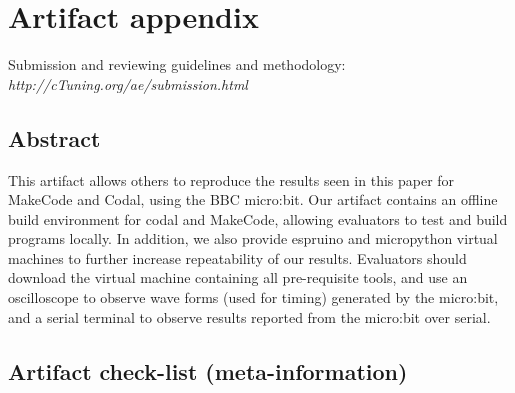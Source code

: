 \pagebreak
\appendix
\section{Artifact appendix}

Submission and reviewing guidelines and methodology: \\
{\em http://cTuning.org/ae/submission.html}

\subsection{Abstract}

This artifact allows others to reproduce the results seen in this paper for MakeCode and Codal, using the BBC micro:bit. Our artifact contains an offline build environment for codal and MakeCode, allowing evaluators to test and build programs locally. In addition, we also provide espruino and micropython virtual machines to further increase repeatability of our results. Evaluators should download the virtual machine containing all pre-requisite tools, and use an oscilloscope to observe wave forms (used for timing) generated by the micro:bit, and a serial terminal to observe results reported from the micro:bit over serial.


\subsection{Artifact check-list (meta-information)}

